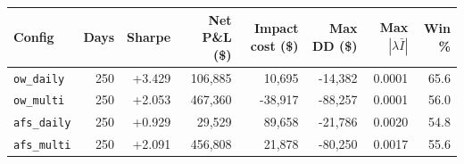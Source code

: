 \begin{tabular}{lrrrrrrr}
\toprule
Config & Days & Sharpe & Net P\&L (\$) & Impact cost (\$) & Max DD (\$) & Max $|\lambda\bar I|$ & Win \% \\
\midrule
\texttt{ow\_daily} & 250 & +3.429 & 106,885 & 10,695 & -14,382 & 0.0001 & 65.6 \\
\texttt{ow\_multi} & 250 & +2.053 & 467,360 & -38,917 & -88,257 & 0.0001 & 56.0 \\
\texttt{afs\_daily} & 250 & +0.929 & 29,529 & 89,658 & -21,786 & 0.0020 & 54.8 \\
\texttt{afs\_multi} & 250 & +2.091 & 456,808 & 21,878 & -80,250 & 0.0017 & 55.6 \\
\bottomrule
\end{tabular}